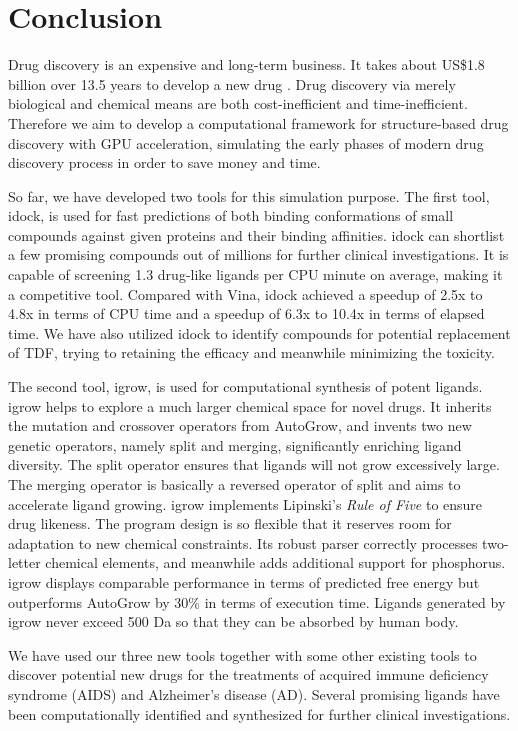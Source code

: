 \chapter{Conclusion}

Drug discovery is an expensive and long-term business. It takes about US\$1.8 billion over 13.5 years to develop a new drug \citep{716}. Drug discovery via merely biological and chemical means are both cost-inefficient and time-inefficient. Therefore we aim to develop a computational framework for structure-based drug discovery with GPU acceleration, simulating the early phases of modern drug discovery process in order to save money and time.

So far, we have developed two tools for this simulation purpose. The first tool, idock, is used for fast predictions of both binding conformations of small compounds against given proteins and their binding affinities. idock can shortlist a few promising compounds out of millions for further clinical investigations. It is capable of screening 1.3 drug-like ligands per CPU minute on average, making it a competitive tool. Compared with Vina, idock achieved a speedup of 2.5x to 4.8x in terms of CPU time and a speedup of 6.3x to 10.4x in terms of elapsed time. We have also utilized idock to identify compounds for potential replacement of TDF, trying to retaining the efficacy and meanwhile minimizing the toxicity.

The second tool, igrow, is used for computational synthesis of potent ligands. igrow helps to explore a much larger chemical space for novel drugs. It inherits the mutation and crossover operators from AutoGrow, and invents two new genetic operators, namely split and merging, significantly enriching ligand diversity. The split operator ensures that ligands will not grow excessively large. The merging operator is basically a reversed operator of split and aims to accelerate ligand growing. igrow implements Lipinski's \textit{Rule of Five} \citep{168} to ensure drug likeness. The program design is so flexible that it reserves room for adaptation to new chemical constraints. Its robust parser correctly processes two-letter chemical elements, and meanwhile adds additional support for phosphorus. igrow displays comparable performance in terms of predicted free energy but outperforms AutoGrow by 30\% in terms of execution time. Ligands generated by igrow never exceed 500 Da so that they can be absorbed by human body. 

We have used our three new tools together with some other existing tools to discover potential new drugs for the treatments of acquired immune deficiency syndrome (AIDS) and Alzheimer's disease (AD). Several promising ligands have been computationally identified and synthesized for further clinical investigations.

\chapterend
